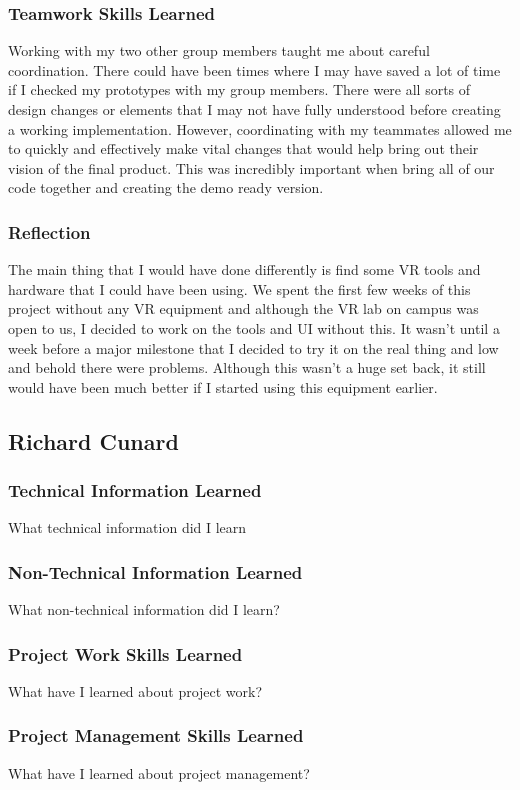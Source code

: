 \documentclass[onecolumn, draftclsnofoot,10pt, compsoc]{IEEEtran}
\begin{document}
\subsubsection{Teamwork Skills Learned}
Working with my two other group members taught me about careful coordination. There could have been times where I may have saved a lot of time if I checked my prototypes with my group members. There were all sorts of design changes or elements that I may not have fully understood before creating a working implementation. However, coordinating with my teammates allowed me to quickly and effectively make vital changes that would help bring out their vision of the final product. This was incredibly important when bring all of our code together and creating the demo ready version.
\subsubsection{Reflection}
The main thing that I would have done differently is find some VR tools and hardware that I could have been using. We spent the first few weeks of this project without any VR equipment and although the VR lab on campus was open to us, I decided to work on the tools and UI without this. It wasn't until a week before a major milestone that I decided to try it on the real thing and low and behold there were problems. Although this wasn't a huge set back, it still would have been much better if I started using this equipment earlier.  


\subsection{Richard Cunard}

\subsubsection{Technical Information Learned}
What technical information did I learn
\subsubsection{Non-Technical Information Learned}
What non-technical information did I learn?
\subsubsection{Project Work Skills Learned}
What have I learned about project work?
\subsubsection{Project Management Skills Learned}
What have I learned about project management?
\end{document}
